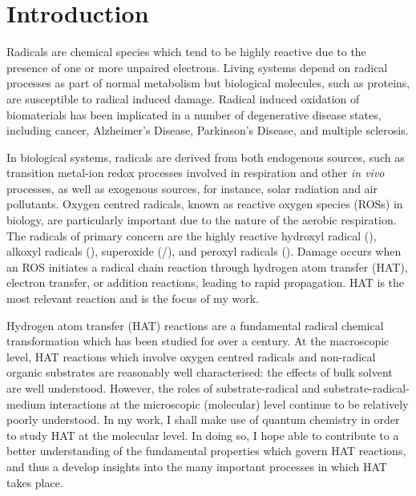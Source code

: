 
 \chapter{Introduction}

Radicals are chemical species which tend to be highly reactive due to the presence of one or more unpaired electrons. Living systems depend on radical processes as part of normal metabolism but biological molecules, such as proteins, are susceptible to radical induced damage. Radical induced oxidation of biomaterials has been implicated in a number of degenerative disease states, including cancer, Alzheimer's Disease, Parkinson's Disease, and multiple sclerosis.\cite{Barnham2004,Halliwell2007,Valko2007,Hwang2013,Halliwell2015}

In biological systems, radicals are derived from both endogenous sources, such as transition metal-ion redox processes involved in respiration and other \emph{in vivo} processes, as well as exogenous sources, for instance, solar radiation and air pollutants. Oxygen centred radicals, known as reactive oxygen species (ROSs) in biology, are particularly important due to the nature of the aerobic respiration. The radicals of primary concern are the highly reactive hydroxyl radical (), alkoxyl radicals (), superoxide (/), and peroxyl radicals ().\cite{Halliwell2015} Damage occurs when an ROS initiates a radical chain reaction through hydrogen atom transfer (HAT), electron transfer, or addition reactions, leading to rapid propagation. HAT is the most relevant reaction and is the focus of my work.

Hydrogen atom transfer (HAT) reactions are a fundamental radical chemical transformation which has been studied for over a century.\cite{Kochi1973,Parsons2000} At the macroscopic level, HAT reactions which involve oxygen centred radicals and non-radical organic substrates are reasonably well characterised: the effects of bulk solvent are well understood.\cite{Litwinienko2007} However, the roles of substrate-radical and substrate-radical-medium interactions at the microscopic (molecular) level continue to be relatively poorly understood. In my work, I shall make use of quantum chemistry in order to study HAT at the molecular level. In doing so, I hope able to contribute to a better understanding of the fundamental properties which govern HAT reactions, and thus a develop insights into the many important processes in which HAT takes place.

